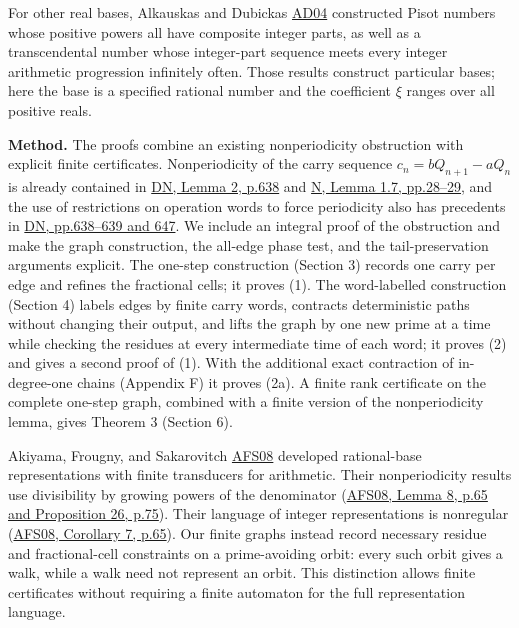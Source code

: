 \documentclass[11pt,reqno]{amsart}
\theoremstyle{definition}
\theoremstyle{remark}
\begin{document}
For other real bases, Alkauskas and Dubickas \hyperref[ref-ad04]{AD04}
constructed Pisot numbers whose positive powers all have composite
integer parts, as well as a transcendental number whose integer-part
sequence meets every integer arithmetic progression infinitely often.
Those results construct particular bases; here the base is a specified
rational number and the coefficient \(\xi\) ranges over all positive reals.

\textbf{Method.} The proofs combine an existing nonperiodicity obstruction with
explicit finite certificates. Nonperiodicity of the carry sequence
\(c_n=bQ_{n+1}-aQ_n\) is already contained in
\hyperref[ref-dn]{DN, Lemma 2, p.638} and \hyperref[ref-n]{N, Lemma 1.7, pp.28--29}, and
the use of restrictions on operation words to force periodicity also has
precedents in \hyperref[ref-dn]{DN, pp.638--639 and 647}. We include an integral
proof of the obstruction and make the graph construction, the all-edge
phase test, and the tail-preservation arguments explicit. The one-step construction (Section 3) records one carry per edge and refines
the fractional cells; it proves (1). The word-labelled construction (Section 4)
labels edges by finite carry words, contracts deterministic paths without
changing their output, and lifts the graph by one new prime at a time
while checking the residues at every intermediate time of each word; it
proves (2) and gives a second proof of (1). With the additional exact
contraction of in-degree-one chains (Appendix F) it proves (2a). A finite rank certificate on
the complete one-step graph, combined with a finite version of the
nonperiodicity lemma, gives Theorem 3 (Section 6).

Akiyama, Frougny, and Sakarovitch \hyperref[ref-afs08]{AFS08} developed
rational-base representations with finite transducers for arithmetic.
Their nonperiodicity results use divisibility by growing powers of the
denominator (\hyperref[ref-afs08]{AFS08, Lemma 8, p.65 and Proposition 26, p.75}).
Their language of integer representations is nonregular
(\hyperref[ref-afs08]{AFS08, Corollary 7, p.65}). Our finite graphs instead
record necessary residue and fractional-cell constraints on a
prime-avoiding orbit: every such orbit gives a walk, while a walk need
not represent an orbit. This distinction allows finite certificates
without requiring a finite automaton for the full representation language.
\end{document}

